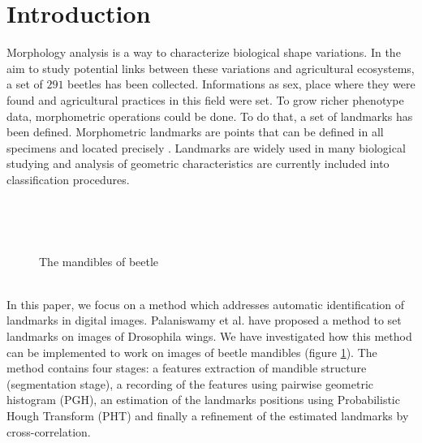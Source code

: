 \documentclass[twoside,twocolumn,10pt]{article}
\begin{document}


\section{Introduction}

\copyrightspace
Morphology analysis is a way to characterize biological shape
variations. In the aim to study potential links between these
variations and agricultural ecosystems, a set of $291$ beetles has been collected. Informations as
sex, place where they were found and agricultural practices in
this field were set. To grow richer phenotype data, morphometric
operations could be done. To do that, a set of landmarks has been
defined. Morphometric landmarks are points that can be defined in all specimens and
located precisely \cite{web2010}. Landmarks are widely used in many biological
studying and analysis of geometric characteristics are currently included
into classification procedures.

~\\
\begin{figure}[h!]
\centering
{}~~
\caption{The mandibles of beetle}
\label{fig:figure_11}
\end{figure}
\\
In this paper, we focus on a method which addresses automatic identification of
landmarks in digital images. Palaniswamy et
al. \cite{palaniswamy2010automatic} have proposed a method to set landmarks
on images of Drosophila wings. We have investigated how this method can be
implemented to work on images of beetle mandibles (figure
\ref{fig:figure_11}). The method contains four stages: a features extraction of mandible
structure (segmentation stage), a recording of the features using pairwise
geometric histogram (PGH), an estimation of the landmarks positions using
Probabilistic Hough Transform (PHT) and finally a refinement of the estimated
landmarks by cross-correlation.
\end{document}
